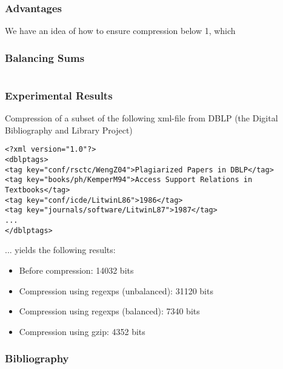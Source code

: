 \documentclass[slidestop,compress,mathserif, xcolor=table]{beamer}
\begin{document}
\begin{frame}
  \frametitle{Advantages}

  We have an idea of how to ensure compression below 1, which
\end{frame}

\begin{frame}[fragile]
  \frametitle{Balancing Sums}
 
{\tiny
\begin{verbatim}

\end{verbatim}
} 
  

\end{frame}

\begin{frame}[fragile]
  \frametitle{Experimental Results}

  Compression of a subset of the following xml-file from DBLP (the Digital Bibliography and Library Project)

{\tiny
\begin{verbatim}
<?xml version="1.0"?>
<dblptags>
<tag key="conf/rsctc/WengZ04">Plagiarized Papers in DBLP</tag>
<tag key="books/ph/KemperM94">Access Support Relations in Textbooks</tag>
<tag key="conf/icde/LitwinL86">1986</tag>
<tag key="journals/software/LitwinL87">1987</tag>
...
</dblptags>
\end{verbatim}
} 

  ... yields the following results:

  \begin{itemize}
  \item Before compression: 14032 bits
  \item Compression using regexps (unbalanced): 31120 bits
  \item Compression using regexps (balanced): 7340 bits
  \item Compression using gzip: 4352 bits
  \end{itemize}

\end{frame}


\begin{frame}
  \frametitle{Bibliography}
  
  
  
  
\end{frame}
\end{document}
